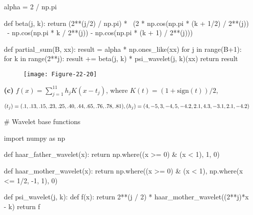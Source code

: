 \begin{python}
alpha = 2 / np.pi

def beta(j, k):
    return (2**(j/2) / np.pi) *  \
            (2 * np.cos(np.pi * (k + 1/2) / 2**(j)) \
            - np.cos(np.pi * k / 2**(j)) - np.cos(np.pi * (k + 1) / 2**(j)))

def partial_sum(B, xx):
    result = alpha * np.ones_like(xx)
    for j in range(B+1):
        for k in range(2**j):
            result += beta(j, k) * psi_wavelet(j, k)(xx)
    return result
\end{python}


\begin{figure}[H]
\texttt{[image: Figure-22-20]}
\end{figure}

\textbf{(c)} \(f(x) = \sum_{j=1}^{11} h_j K(x - t_j)\), where
\(K(t) = (1 + \text{sign}(t)) / 2\),

\[ 
(t_j) = (.1, .13, .15, .23, .25, .40, .44, .65, .76, .78, .81), \\
(h_j) = (4, -5, 3, -4, 5, -4.2, 2.1, 4.3, -3.1, 2.1, -4.2)
\]

\begin{python}
# Wavelet base functions

import numpy as np

def haar_father_wavelet(x):
    return np.where((x >= 0) & (x < 1), 1, 0)

def haar_mother_wavelet(x):
    return np.where((x >= 0) & (x < 1), np.where(x <= 1/2, -1, 1), 0)

def psi_wavelet(j, k):
    def f(x):
        return 2**(j / 2) * haar_mother_wavelet((2**j)*x - k)
    return f
\end{python}

